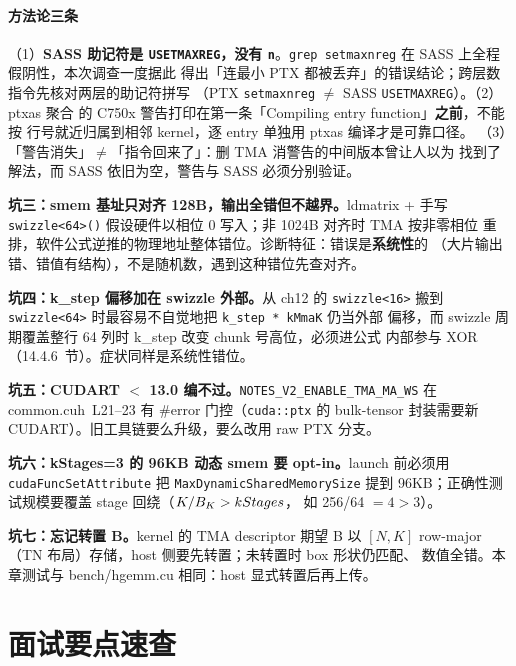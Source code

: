 \paragraph{方法论三条} （1）\textbf{SASS 助记符是 \texttt{USETMAXREG}，没有
\texttt{n}}。\texttt{grep setmaxnreg} 在 SASS 上全程假阴性，本次调查一度据此
得出「连最小 PTX 都被丢弃」的错误结论；跨层数指令先核对两层的助记符拼写
（PTX \texttt{setmaxnreg} $\ne$ SASS \texttt{USETMAXREG}）。（2）ptxas 聚合
的 C750x 警告打印在第一条「Compiling entry function」\textbf{之前}，不能按
行号就近归属到相邻 kernel，逐 entry 单独用 ptxas 编译才是可靠口径。
（3）「警告消失」$\ne$「指令回来了」：删 TMA 消警告的中间版本曾让人以为
找到了解法，而 SASS 依旧为空，警告与 SASS 必须分别验证。

\textbf{坑三：smem 基址只对齐 128B，输出全错但不越界。}\allowbreak{}ldmatrix + 手写
\texttt{swizzle\allowbreak{}<64>\allowbreak{}()} 假设硬件以相位 0 写入；非 1024B 对齐时 TMA 按非零相位
重排，软件公式逆推的物理地址整体错位。诊断特征：错误是\textbf{系统性}的
（大片输出错、错值有结构），不是随机数，遇到这种错位先查对齐。

\textbf{坑四：k\_step 偏移加在 swizzle 外部。}从 ch12 的 \texttt{swizzle<16>}
搬到 \texttt{swizzle<64>} 时最容易不自觉地把 \texttt{k\_step * kMmaK} 仍当外部
偏移，而 swizzle 周期覆盖整行 64 列时 k\_step 改变 chunk 号高位，必须进公式
内部参与 XOR（14.4.6~节）。症状同样是系统性错位。

\textbf{坑五：CUDART $<$ 13.0 编不过。}\texttt{NOTES\_\allowbreak{}V2\_\allowbreak{}ENABLE\_\allowbreak{}TMA\_\allowbreak{}MA\_\allowbreak{}WS}
在 common.cuh~L21--23 有 \#error 门控（\texttt{cuda::ptx} 的 bulk-tensor
封装需要新 CUDART）。旧工具链要么升级，要么改用 raw PTX 分支。

\textbf{坑六：kStages=3 的 96KB 动态 smem 要 opt-in。}\allowbreak{}launch 前必须用
\texttt{cuda\allowbreak{}Func\allowbreak{}Set\allowbreak{}Attribute} 把 \texttt{Max\allowbreak{}Dynamic\allowbreak{}Shared\allowbreak{}Memory\allowbreak{}Size}
提到 96KB；正确性测试规模要覆盖 stage 回绕（$K/B\sb{K} > kStages$，
如 256/64 $= 4 > 3$）。

\textbf{坑七：忘记转置 B。}\allowbreak{}kernel 的 TMA descriptor 期望 B 以 $[N, K]$
row-major（TN 布局）存储，host 侧要先转置；未转置时 box 形状仍匹配、
数值全错。本章测试与 bench/hgemm.cu 相同：host 显式转置后再上传。

\section{面试要点速查}


